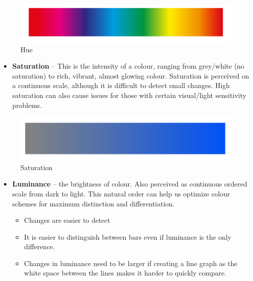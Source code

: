 \documentclass[
]{book}
\providecommand{\tightlist}{%
  \setlength{\itemsep}{0pt}\setlength{\parskip}{0pt}}
\begin{document}
\begin{figure}
\includegraphics[width=1\linewidth]{img/visegs/eghue} \caption{Hue}\label{fig:unnamed-chunk-13}
\end{figure}

\begin{itemize}
\tightlist
\item
  \textbf{Saturation} -- This is the intensity of a colour, ranging from grey/white (no saturation) to rich, vibrant, almost glowing colour. Saturation is perceived on a continuous scale, although it is difficult to detect small changes. High saturation can also cause issues for those with certain visual/light sensitivity problems.
\end{itemize}

\begin{figure}
\includegraphics[width=1\linewidth]{img/visegs/egsat} \caption{Saturation}\label{fig:unnamed-chunk-14}
\end{figure}

\begin{itemize}
\tightlist
\item
  \textbf{Luminance} -- the brightness of colour. Also perceived as continuous ordered scale from dark to light. This natural order can help us optimize colour schemes for maximum distinction and differentiation.

  \begin{itemize}
  \tightlist
  \item
    Changes are easier to detect
  \item
    It is easier to distinguish between bars even if luminance is the only difference.
  \item
    Changes in luminance need to be larger if creating a line graph as the white space between the lines makes it harder to quickly compare.
  \end{itemize}
\end{itemize}
\end{document}
